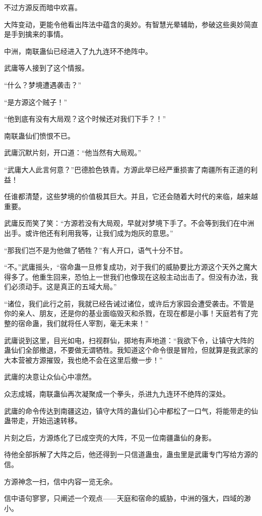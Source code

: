 \begin{this_body}
不过方源反而暗中欢喜。

大阵变动，更能令他看出阵法中蕴含的奥妙。有智慧光晕辅助，参破这些奥妙简直是手到擒来的事情。

中洲，南联蛊仙已经进入了九九连环不绝阵中。

武庸等人接到了这个情报。

“什么？梦境遭遇袭击？”

“是方源这个贼子！”

“他到底有没有大局观？这个时候还对我们下手？！”

南联蛊仙们愤恨不已。

武庸沉默片刻，开口道：“他当然有大局观。”

“武庸大人此言何意？”巴德脸色铁青。方源此举已经严重损害了南疆所有正道的利益！

任谁都清楚，这些梦境的价值极其巨大。并且，它还会随着大时代的来临，越来越重要。

武庸反而笑了笑：“方源若没有大局观，早就对梦境下手了。不会等到我们在中洲出手。或许他还有利用我等，让我们成为炮灰的意思。”

“那我们岂不是为他做了牺牲？”有人开口，语气十分不甘。

“不。”武庸摇头，“宿命蛊一旦修复成功，对于我们的威胁要比方源这个天外之魔大得多了。他重生回来，恐怕上一世我们也像现在这般主动出击了。但没有办法，我们必须动手。这是真正的五域大局。”

“诸位，我们此行之前，我就已经告诫过诸位，或许后方家园会遭受袭击。不管是你的亲人、朋友，还是你的基业面临毁灭和杀戮，在现在都是小事！天庭若有了完整的宿命蛊，我们就将任人宰割，毫无未来！”

武庸说到这里，目光如电，扫视群仙，掷地有声地道：“我欲下令，让镇守大阵的蛊仙们全部撤退，不要做无谓牺牲。我知道这个命令很是冒险，但就算是我武家的大本营被方源摧毁，我也绝不会在这里后撤一步！”

武庸的决意让众仙心中凛然。

众志成城，南联蛊仙再次凝聚成一个拳头，杀进九九连环不绝阵的深处。

武庸的命令传达到南疆这边，镇守大阵的蛊仙们心中都松了一口气，将能带走的仙蛊带走，开始迅速转移。

片刻之后，方源炼化了已成空壳的大阵，不见一位南疆蛊仙的身影。

待他全部拆解了大阵之后，他还得到一只信道蛊虫，蛊虫里是武庸专门写给方源的信。

方源神念一扫，信中内容一览无余。

信中语句寥寥，只阐述一个观点——天庭和宿命的威胁，中洲的强大，四域的渺小。


\end{this_body}
